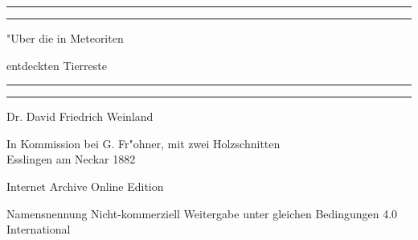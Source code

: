 \documentclass[a4paper, 11pt, oneside]{article}
\begin{document}
\frakfamily
\begin{titlepage} %
	\centering %
	\scshape %

	
	\rule{\textwidth}{1.6pt}\vspace*{-\baselineskip}\vspace*{2pt} %
	\rule{\textwidth}{0.4pt} %
	
	\vspace{1.5\baselineskip} %
	
	{\LARGE "Uber die in Meteoriten}
	
	\vspace{1.2\baselineskip}
	
	{\LARGE entdeckten Tierreste}
	
	\vspace{1\baselineskip} %

	\rule{\textwidth}{0.4pt}\vspace*{-\baselineskip}\vspace{3.2pt} %
	\rule{\textwidth}{1.6pt} %
	
	\vspace{1\baselineskip} %
	
	
	{Dr. David Friedrich Weinland} %
	
	\vspace*{1\baselineskip} %
	
    {\small In Kommission bei G. Fr"ohner, mit zwei Holzschnitten\\ Esslingen am Neckar 1882} %
    
    \vspace*{\fill}

	{\small\scshape }

    Internet Archive Online Edition  %
	
	{\small Namensnennung Nicht-kommerziell Weitergabe unter gleichen Bedingungen 4.0 International} %
\end{titlepage}
\setlength{\parskip}{1mm plus1mm minus1mm}
\clearpage
\tableofcontents
\clearpage
\end{document}
